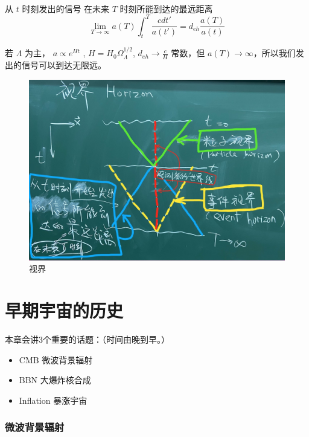 \documentclass[12pt]{ctexart}
\begin{document}
\subsection{}
从  $t$ 时刻发出的信号 在未来 $T$ 时刻所能到达的最远距离
\begin{equation}
    \lim_{T \to \infty}   a(T) \int_t^T \frac{cdt'}{a(t')} = d_{eh} \frac{a(T)}{a(t)}
\end{equation}

若 $\Lambda$ 为主， $a\propto e^{Ht}$ , $H=H_0 \Omega_\Lambda^{1/2}$,  $d_{eh}\to \frac{c}{H}$ 常数，但 $a(T)\to \infty$，所以我们发出的信号可以到达无限远。 

\begin{figure}[!hbtp]
	\centering
	\includegraphics[width=1.0\linewidth]{horizon.jpg}
	\caption{视界}
\end{figure}

\part*{早期宇宙的历史}

本章会讲3个重要的话题：（时间由晚到早。）
\begin{itemize}
    \item CMB 微波背景辐射
    \item BBN 大爆炸核合成
    \item Inflation 暴涨宇宙
\end{itemize}

\section{微波背景辐射}
\end{document}
